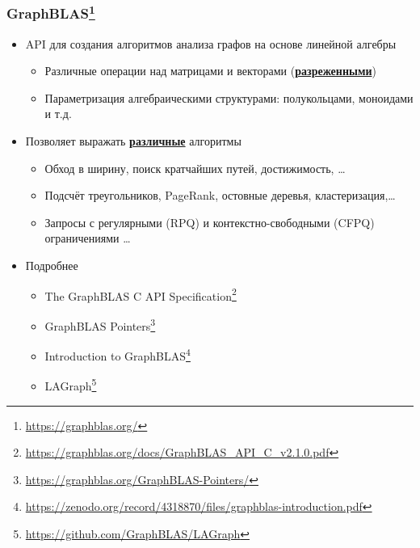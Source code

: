\documentclass[xcolor=table,aspectratio=169]{beamer}
\begin{document}
\begin{frame}[fragile]
  \frametitle{GraphBLAS\footnote{\url{https://graphblas.org/}}}
  \begin{itemize}
    \item API для создания алгоритмов анализа графов на основе линейной алгебры 
    \begin{itemize}
      \item Различные операции над матрицами и векторами (\underline{\textbf{разреженными}})
      \item Параметризация алгебраическими структурами: полукольцами, моноидами и т.д.
    \end{itemize}
    \pause
    \item Позволяет выражать \underline{\textbf{различные}} алгоритмы
    \begin{itemize}
      \item Обход в ширину, поиск кратчайших путей, достижимость, \ldots
      \item Подсчёт треугольников, PageRank, остовные деревья, кластеризация,\ldots
      \item Запросы с регулярными (RPQ) и контекстно-свободными (CFPQ) ограничениями \ldots      
    \end{itemize}
    \pause
    \item Подробнее
    \begin{itemize}
      \item The GraphBLAS C API Specification\footnote{\url{https://graphblas.org/docs/GraphBLAS_API_C_v2.1.0.pdf}}
      \item GraphBLAS Pointers\footnote{\url{https://graphblas.org/GraphBLAS-Pointers/}}
      \item Introduction to GraphBLAS\footnote{\url{https://zenodo.org/record/4318870/files/graphblas-introduction.pdf}}
      \item LAGraph\footnote{\url{https://github.com/GraphBLAS/LAGraph}}
    \end{itemize}
    \end{itemize}
\end{frame}
\end{document}
